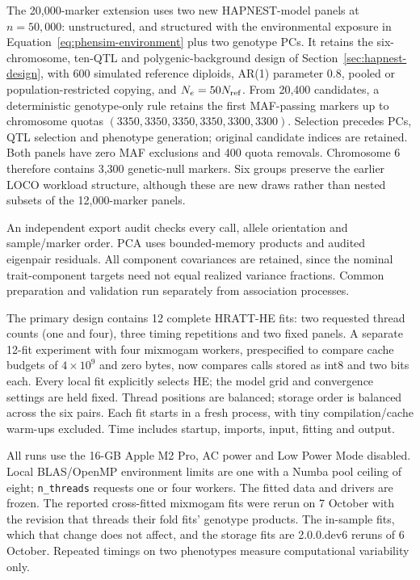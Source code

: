 \documentclass[11pt]{article}
\newcommand{\code}[1]{\texttt{#1}}
\begin{document}
The 20,000-marker extension uses two new HAPNEST-model panels at
$n=50{,}000$: unstructured, and structured with the environmental exposure
in Equation~\eqref{eq:phensim-environment} plus two genotype PCs.
It retains the six-chromosome, ten-QTL and polygenic-background design
of Section~\ref{sec:hapnest-design}, with 600 simulated reference diploids,
AR(1) parameter 0.8, pooled or population-restricted copying, and
$N_e=50N_{\rm ref}$. From 20,400 candidates, a deterministic genotype-only
rule retains the first MAF-passing markers up to chromosome quotas
$(3350,3350,3350,3350,3300,3300)$. Selection precedes PCs, QTL selection
and phenotype generation; original candidate indices are retained.
Both panels have zero MAF exclusions and 400 quota removals. Chromosome 6
therefore contains 3,300 genetic-null markers. Six groups preserve the
earlier LOCO workload structure, although these are new draws rather than
nested subsets of the 12,000-marker panels.

An independent export audit checks every call, allele orientation and
sample/marker order.
PCA uses bounded-memory products and audited eigenpair residuals.
All component covariances are retained, since the nominal trait-component
targets need not equal realized variance fractions. Common preparation
and validation run separately from association processes.

The primary design contains 12 complete HRATT-HE fits: two requested
thread counts (one and four), three timing repetitions and two fixed
panels. A separate 12-fit experiment with four mixmogam
workers, prespecified to compare cache budgets of $4\times10^9$ and zero
bytes, now compares calls stored as int8 and two bits each. Every local fit
explicitly selects HE; the model grid and convergence settings are held
fixed. Thread positions are balanced; storage order is balanced across
the six pairs. Each fit starts in a fresh process, with tiny
compilation/cache warm-ups excluded. Time includes startup, imports,
input, fitting and output.

All runs use the 16-GB Apple M2 Pro, AC power and Low Power Mode disabled.
Local BLAS/OpenMP environment limits are one with a Numba pool ceiling
of eight; \code{n\_threads} requests one or four workers. The fitted
data and drivers are frozen. The reported cross-fitted mixmogam fits were rerun on 7 October
with the revision that threads their fold fits' genotype products. The
in-sample fits, which that change does not affect, and the storage fits
are 2.0.0.dev6 reruns of 6 October.
Repeated timings on two phenotypes measure computational
variability only.
\end{document}
